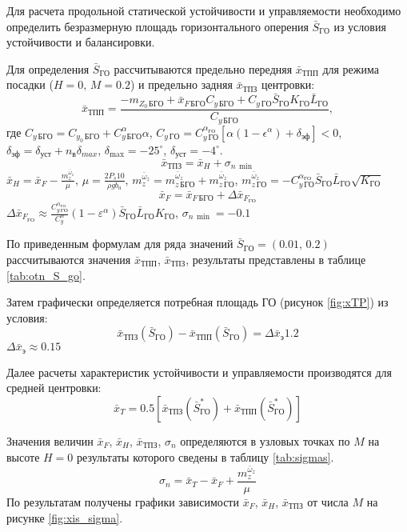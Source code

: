 Для расчета продольной статической устойчивости и управляемости
необходимо определить безразмерную площадь горизонтального оперения
$\bar{S}_{ГО}$ из условия устойчивости и
балансировки.

Для определения $\bar{S}_{ГО}$ рассчитываются
предельно передняя $\bar{x}_{ТПП}$ для режима
посадки ($H=0,\, M=0.2$) и предельно задняя
$\bar{x}_{ТПЗ}$ центровки:
\begin{equation}
    \bar{x}_{ТПП} = \frac{-m_{Z_0\, БГО} + \bar{x}_{F\, БГО}C_{y\, БГО}+ 
    C_{y\, ГО} \bar{S}_{ГО} K_{ГО} \bar{L}_{ГО}}{C_{y\, БГО}},
\end{equation}
где $C_{y \, БГО} = C_{y_0\,{БГО}} + C_{y\, БГО}^\alpha \alpha$, 
$C_{y\, ГО} = C_{y\, ГО}^{\alpha_{ГО}} \left[ \alpha(1-\epsilon^\alpha) + 
\delta_{эф}\right] < 0$, $\delta_{эф} = \delta_{уст} + n_в \delta_{max}$,
$\delta_{\max} = -25^\circ$, $\delta_{уст} = -4^\circ$. 
\begin{equation}
    \bar{x}_{ТПЗ} = \bar{x}_{H} + \sigma_{n\, \min}
\end{equation}
$\bar{x}_{H} = \bar{x}_F - \frac{m_z^{\bar{\omega}_z}}{\mu}$, $\mu = \frac{2 P_s 10 }{\rho g b_a}$,
$m_z^{\bar{\omega}_z} = m_{z\, БГО}^{\bar{\omega}_z}+m_{z\, ГО}^{\bar{\omega}_z}$,
$m_{z\, ГО}^{\bar{\omega}_z} = - C_{y\, {ГО}}^{\alpha_{ГО}} \bar{S}_{ГО} \bar{L}_{ГО}
\sqrt{K_{ГО}}$
\begin{equation}
    \bar{x}_F = \bar{x}_{F\, БГО} + \Delta \bar{x}_{F_{ГО}}
\end{equation}
$ \Delta \bar{x}_{F_{ГО}} \approx \frac{C_{y\, ГО}^{\alpha_{ГО}} }{C_{y}^\alpha}
(1-\varepsilon^\alpha)\bar{S}_{ГО} \bar{L}_{ГО}
K_{ГО}$, $\sigma_{n\, \min} = -0.1$

По приведенным формулам для ряда значений
$\bar{S}_{ГО} = (0.01,\, 0.2)$ рассчитываются значения $\bar{x}_{ТПП}$,
$\bar{x}_{ТПЗ}$, результаты представлены в таблице \ref{tab:otn_S_go}. 

Затем графически  определяется потребная площадь ГО (рисунок \ref{fig:xTP}) из условия:
\[
    \bar{x}_{ТПЗ}(\bar{S}_{ГО}) - \bar{x}_{ТПП}(\bar{S}_{ГО}) = \Delta \bar{x}_{э} 1.2 
\]
$\Delta \bar{x}_{э} \approx 0.15$

Далее расчеты характеристик устойчивости и управляемости производятся
для средней центровки: 
\[
    \bar{x}_{T} = 0.5 \left[  \bar{x}_{ТПЗ}(\bar{S}_{ГО}^*) + \bar{x}_{ТПП}(\bar{S}_{ГО}^*) \right] 
\]

Значения величин $\bar{x}_F$, $\bar{x}_H$, $\bar{x}_{ТПЗ}$, $\sigma_n$ определяются в
узловых точках по $M$ на высоте $H=0$ результаты которого сведены в таблицу
\ref{tab:sigmas}. 
\[
    \sigma_n = \bar{x}_{T} - \bar{x}_{F} + \frac{m_z^{\bar{\omega}_z}}{\mu}
\]
По результатам получены графики зависимости $\bar{x}_F$, $\bar{x}_H$,
$\bar{x}_{ТПЗ}$ от числа $M$ на рисунке \ref{fig:xis_sigma}.

